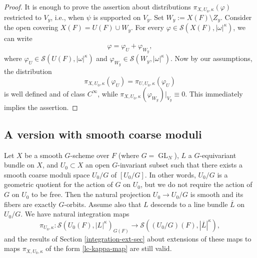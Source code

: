 \documentclass[12pt,reqno]{amsart}
\DeclareMathOperator\C{\mathbb C}
\theoremstyle{definition}
\theoremstyle{remark}
\numberwithin{equation}{section}
\newcommand{\Om}{\Omega}
\renewcommand{\SS}{{\mathcal S}}
\newcommand{\LL}{{\mathcal L}}
\newcommand{\sub}{\subset}
\newcommand{\ov}{\overline}
\newcommand{\om}{\omega}
\newcommand{\GL}{\operatorname{GL}}
\newcommand{\XX}{{\mathcal X}}
\begin{document}
\begin{proof} It is enough to prove the assertion about distributions $\pi_{X,U_0,\kappa}(\varphi)$ restricted to $V_y$, i.e.,
when $\psi$ is supported on $V_y$.
Set $W_y:=X(F)\setminus Z_y$.
Consider the open covering $X(F)=U(F)\cup W_y$. For every $\varphi\in\SS(X(F),|\om|^{\kappa})$, we can write
$$\varphi=\varphi_U+\varphi_{W_y},$$
where $\varphi_U\in \SS(U(F),|\om|^{\kappa})$ and $\varphi_{W_y}\in \SS(W_y,|\om|^{\kappa})$.
Now by our assumptions, the distribution
$$\pi_{X,U_0,\kappa}(\varphi_U)=\pi_{U,U_0,\kappa}(\varphi_U)$$
is well defined and of class $C^\infty$, while $\pi_{X,U_0,\kappa}(\varphi_{W_y})|_{V_y}\equiv 0$.
This immediately implies the assertion.
\end{proof}

\subsection{A version with smooth coarse moduli}


Let $X$ be a smooth $G$-scheme over $F$ (where $G=\GL_N$), $L$ a $G$-equivariant bundle on $X$, and $U_0\sub X$ an open $G$-invariant subset such that
there exists a smooth coarse moduli space $U_0/G$ of $[U_0/G]$. In other words, $U_0/G$ is a geometric quotient for the action of $G$ on $U_0$, but we do not
require the action of $G$ on $U_0$ to be free.
Then the natural projection $U_0\to U_0/G$ is smooth and its fibers are exactly $G$-orbits. Assume also that $L$ descends to a line bundle $\ov{L}$ on $U_0/G$.
We have natural integration maps 
$$\pi_{U_0,\kappa}:\SS(U_0(F),|L|^{\kappa})_{G(F)}\to \SS((U_0/G)(F),|\ov{L}|^{\kappa}),$$
and the results of Section \ref{integration-ext-sec} about extensions of these maps to maps $\pi_{X,U_0,\kappa}$ of the form
\eqref{lc-kappa-map}
are still valid.
\end{document}
